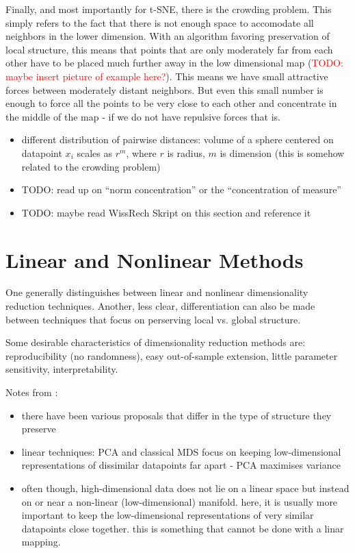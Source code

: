 Finally, and most importantly for t-SNE, there is the crowding problem. 
This simply refers to the fact that there is not enough space to accomodate all neighbors in the lower dimension. 
With an algorithm favoring preservation of local structure, this means that points that are only moderately far from each other have to be placed much further away in the low dimensional map (\textcolor{red}{TODO: maybe insert picture of example here?}). 
This means we have small attractive forces between moderately distant neighbors. 
But even this small number is enough to force all the points to be very close to each other and concentrate in the middle of the map - if we do not have repulsive forces that is. 

\begin{itemize}
    \item different distribution of pairwise distances: volume of a sphere centered on datapoint $x_i$ scales as $r^m$, where $r$ is radius, $m$ is dimension (this is somehow related to the crowding problem) \cite{vdMaa08}
    \item TODO: read up on \enquote{norm concentration} or the \enquote{concentration of measure}
    \item TODO: maybe read WissRech Skript on this section and reference it 
\end{itemize}

\section{Linear and Nonlinear Methods}
One generally distinguishes between linear and nonlinear dimensionality reduction techniques. Another, less clear, differentiation can also be made between techniques that focus on perserving local vs. global structure. 

Some desirable characteristics of dimensionality reduction methods are: reproducibility (no randomness), easy out-of-sample extension, little parameter sensitivity, interpretability.  

Notes from \cite{vdMaa08}: 
\begin{itemize}
    \item there have been various proposals that differ in the type of structure they preserve 
    \item linear techniques: PCA and classical MDS focus on keeping low-dimensional representations of dissimilar datapoints far apart - PCA maximises variance 
    \item often though, high-dimensional data does not lie on a linear space but instead on or near a non-linear (low-dimensional) manifold. here, it is usually more important to keep the low-dimensional representations of very similar datapoints close together. this is something that cannot be done with a linar mapping. 
\end{itemize}

